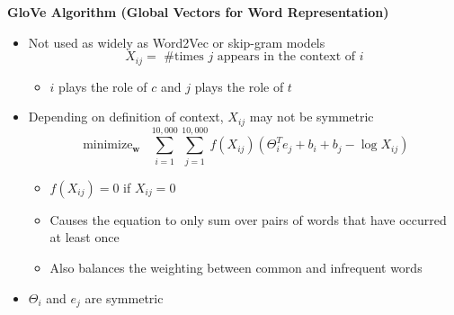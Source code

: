 \documentclass[12pt, letterpaper]{article}
\begin{document}
    \vspace{5mm}
    \textbf{GloVe Algorithm (Global Vectors for Word Representation)}
    \begin{itemize}
        \item Not used as widely as Word2Vec or skip-gram models
        $$X_{ij} =\text{ \# times $j$ appears in the context of $i$}$$
        \begin{itemize}
            \item $i$ plays the role of $c$ and $j$ plays the role of $t$ 
        \end{itemize}
        \item Depending on definition of context, $X_{ij}$ may not be symmetric
        $$\mathop{\text{minimize}}_{\textbf{w}}~~\sum_{i=1}^{10,000}\sum_{j=1}^{10,000}f(X_{ij})(\Theta_i^Te_j+b_i+b_j-\log X_{ij})$$
        \begin{itemize}
            \item $f(X_{ij})=0$ if $X_{ij}=0$ 
            \item Causes the equation to only sum over pairs of words that have occurred at least once
            \item Also balances the weighting between common and infrequent words
        \end{itemize}
        \item $\Theta_i$ and $e_j$ are symmetric
    \end{itemize}
\end{document}
